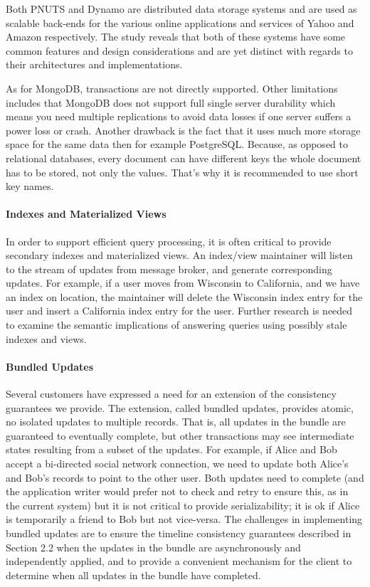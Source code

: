 \documentclass[12pt,letter]{article}
\begin{document}
Both PNUTS and Dynamo are distributed data storage systems and are used as scalable back-ends for the various online applications and services of Yahoo and Amazon respectively. The study reveals that both of these systems have some common features and design considerations and are yet distinct with regards to their architectures and implementations.

As for MongoDB, transactions are not directly supported. Other limitations includes that MongoDB does not support full single server durability which means you need multiple replications to avoid data losses if one server suffers a power loss or crash. Another drawback is the fact that it uses much more storage space for the same data then for example PostgreSQL. Because, as opposed to relational databases, every document can have different keys the whole document has to be stored, not only the values. That's why it is recommended to use short key names.

\paragraph*{Indexes and Materialized Views} 
In order to support efficient query processing, it is often critical to provide secondary indexes and materialized views. An index/view maintainer will listen to the stream of updates from message broker, and generate corresponding updates. For example, if a user moves from Wisconsin to California, and we have an index on location, the maintainer will delete the Wisconsin index entry for the user and insert a California index entry for the user. Further research is needed to examine the semantic implications of answering queries using possibly stale indexes and views.

\paragraph*{Bundled Updates} 
Several customers have expressed a need for an extension of the consistency guarantees we provide. The extension, called bundled updates, provides atomic, no isolated updates to multiple records. That is, all updates in the bundle are guaranteed to eventually complete, but other transactions may see intermediate states resulting from a subset of the updates. For example, if Alice and Bob accept a bi-directed social network connection, we need to update both Alice’s and Bob’s records to point to the other user. Both updates need to complete (and the application writer would prefer not to check and retry to ensure this, as in the current system) but it is not critical to provide serializability; it is ok if Alice is temporarily a friend to Bob but not vice-versa. The challenges in implementing bundled updates are to ensure the timeline consistency guarantees described in Section 2.2 when the updates in the bundle are asynchronously and independently applied, and to provide a convenient mechanism for the client to determine when all updates in the bundle have completed.
\end{document}
